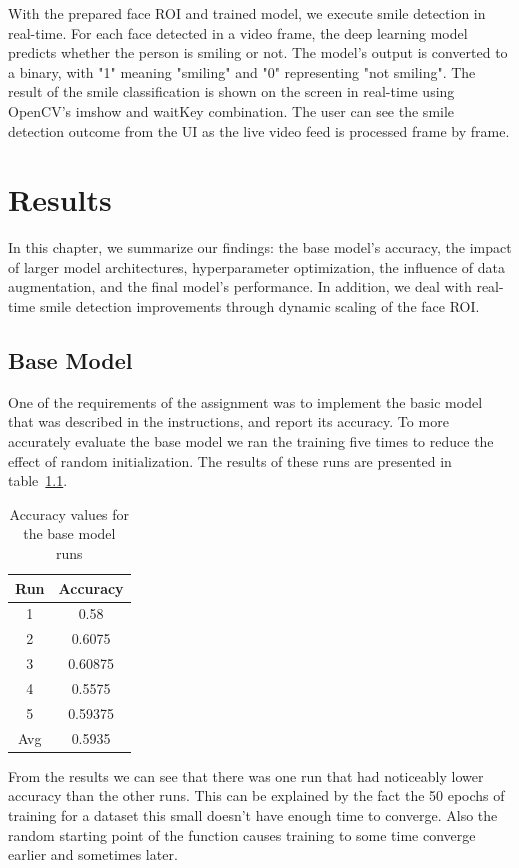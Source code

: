 \documentclass[12pt,a4paper,english
]{tunithesis}
\begin{document}
With the prepared face ROI and trained model, we execute smile detection in real-time. For each face detected in a video frame, the deep learning model predicts whether the person is smiling or not. The model's output is converted to a binary, with "1" meaning "smiling" and "0" representing "not smiling". The result of the smile classification is shown on the screen in real-time using OpenCV's imshow and waitKey combination. The user can see the smile detection outcome from the UI as the live video feed is processed frame by frame.


\chapter{Results}
\label{sec:results}
In this chapter, we summarize our findings: the base model's accuracy, the impact of larger model architectures, hyperparameter optimization, the influence of data augmentation, and the final model's performance. In addition, we deal with real-time smile detection improvements through dynamic scaling of the face ROI.

\section{Base Model}
One of the requirements of the assignment was to implement the basic model that was described in the instructions, and report its accuracy. To more accurately evaluate the base model we ran the training five times to reduce the effect of random initialization. The results of these runs are presented in table~\ref{tab:basemodel}.

\begin{table}[h!]
\centering
\caption{Accuracy values for the base model runs}
\begin{tabular}{|c|c|}
\hline
Run & Accuracy \\
\hline
1 & 0.58 \\
2 & 0.6075 \\
3 & 0.60875 \\
4 & 0.5575 \\
5 & 0.59375 \\
\hline
Avg & 0.5935 \\
\hline
\end{tabular}
\label{tab:basemodel}
\end{table}

From the results we can see that there was one run that had noticeably lower accuracy than the other runs. This can be explained by the fact the 50 epochs of training for a dataset this small doesn't have enough time to converge. Also the random starting point of the function causes training to some time converge earlier and sometimes later.
\end{document}
